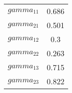 \begin{tabular}{cc}
\toprule 
$gamma_{11}$ & 0.686 \\
$gamma_{21}$ & 0.501 \\
$gamma_{12}$ & 0.3 \\
$gamma_{22}$ & 0.263 \\
$gamma_{13}$ & 0.715 \\
$gamma_{23}$ & 0.822 \\
\bottomrule 
\end{tabular}
